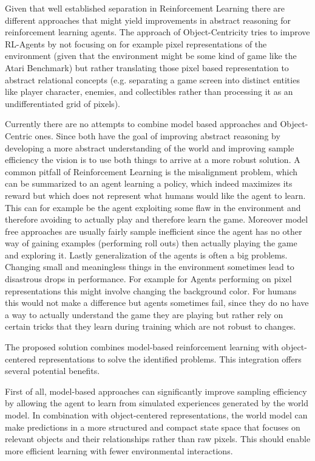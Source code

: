 \documentclass[
	english,
	ruledheaders=section,
	class=report,
	thesis={type=master},
	accentcolor=9c,
	custommargins=true,
	marginpar=false,
	parskip=half-,
	fontsize=11pt,
]{tudapub}
\begin{document}
Given that well established separation in Reinforcement Learning there are different approaches that might yield improvements in abstract reasoning for reinforcement learning agents. The approach of Object-Centricity tries to
improve RL-Agents by not focusing on for example pixel representations of the environment (given that the environment might be some kind of game like the Atari Benchmark) but rather translating those pixel based representation
to abstract relational concepts (e.g. separating a game screen into distinct entities like player character, enemies, and collectibles rather than processing it as an undifferentiated grid of pixels).



Currently there are no attempts to combine model based approaches and Object-Centric ones. Since both have the goal of improving abstract reasoning by developing a more abstract understanding
 of the world and improving sample efficiency the vision is to use both things to arrive at a more robust solution.
A common pitfall of Reinforcement Learning is the misalignment problem, which can be summarized to an agent learning a policy, which indeed maximizes its reward but which does not represent
 what humans would like the agent to learn. This can for example be the agent exploiting some flaw in the environment and therefore avoiding to actually play and therefore learn the game.
  Moreover model free approaches are usually fairly sample inefficient since the agent has no other way of gaining examples (performing roll outs) then actually playing the game and exploring it.
Lastly generalization of the agents is often a big problems. Changing small and meaningless things in the environment sometimes lead to disastrous drops in performance. For example for Agents
 performing on pixel representations this might involve changing the background color. For humans this would not make a difference but agents sometimes fail, since they do no have a way to 
 actually understand the game they are playing but rather rely on certain tricks that they learn during training which are not robust to changes.

The proposed solution combines model-based reinforcement learning with object-centered representations to solve the identified problems. This integration offers several potential benefits.

First of all, model-based approaches can significantly improve sampling efficiency by allowing the agent to learn from simulated experiences generated by the world model. In combination with object-centered representations,
 the world model can make predictions in a more structured and compact state space that focuses on relevant objects and their relationships rather than raw pixels. This should enable more efficient learning with fewer environmental interactions.
\end{document}
